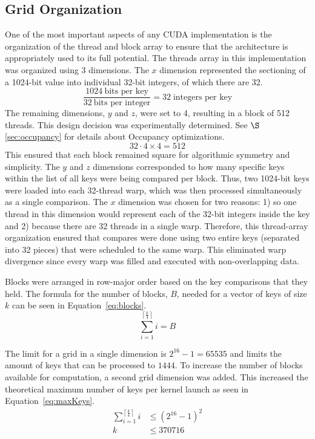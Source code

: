 \documentclass[12pt]{ucthesis}
\begin{document}
\subsection{Grid Organization}
\label{sec:gridorg}
One of the most important aspects of any CUDA implementation is the 
organization of the thread and block array to ensure that the architecture is 
appropriately used to its full potential. The threads array in this 
implementation was organized using 3 dimensions. The $x$ dimension represented 
the sectioning of a 1024-bit value into individual 32-bit integers, of which 
there are 32. 
\begin{displaymath}
   \frac{1024 \:\mbox{bits per key}}{32 \:\mbox{bits per integer}} = 
   32 \;\mbox{integers per key}
\end{displaymath}
The remaining dimensions, $y$ and $z$, were set to 4, resulting in a block of 
512 threads. This design decision was experimentally determined. See 
$\S$\ref{sec:occupancy} for details about Occupancy optimizations.
\begin{displaymath}
   32 \cdot 4 \times 4 = 512
\end{displaymath}
This ensured that each block remained square for algorithmic 
symmetry and simplicity. The $y$ and $z$ dimensions corresponded to how many 
specific keys within the list of all keys were being compared per block. 
Thus, two 1024-bit keys were loaded into each 32-thread warp, which was 
then processed simultaneously as a single comparison. The $x$ dimension was 
chosen for two reasons: 1) so one thread in this dimension would represent 
each of the 32-bit integers inside the key and 2) because there are 32 threads 
in a single warp. Therefore, this thread-array organization ensured that 
compares were done using two entire keys (separated into 32 pieces) that were 
scheduled to the same warp. This eliminated warp divergence since every warp 
was filled and executed with non-overlapping data.

Blocks were arranged in row-major order based on the key comparisons that they 
held. The formula for the number of blocks, $B$, needed for a vector of keys of 
size $k$ can be seen in Equation~\ref{eq:blocks}.
\begin{equation}
   \sum_{i=1}^{\left\lceil \frac{k}{4} \right\rceil}i = B
   \label{eq:blocks}
\end{equation}

The limit for a grid in a single dimension is $2^{16} - 1 = 65535$ 
and limits the amount of keys that can be processed to $1444$. To increase 
the number of blocks available for computation, a second grid dimension was 
added. This increased the theoretical maximum number of keys per kernel 
launch as seen in Equation~\ref{eq:maxKeys}.
\begin{equation}
   \begin{split}
   \sum_{i = 1}^{\left\lceil\frac{k}{4}\right\rceil} i & \leq {\left(2^{16} - 
   1\right)}^2\\
   k & \leq 370716\\
   \end{split}
   \label{eq:maxKeys}
\end{equation}
\end{document}
